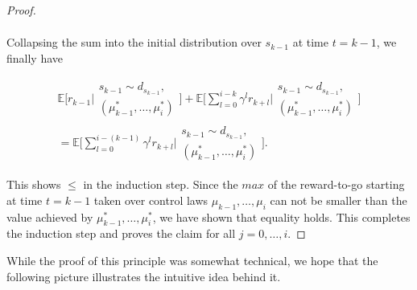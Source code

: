 \documentclass[11pt]{article} %
\begin{document}
\begin{proof}
\begin{equation}
\begin{array}{rll}
	\end{array}
\end{equation}

Collapsing the sum into the initial distribution over $s_{k-1}$ at time $t = k-1$, we finally have

\begin{equation}
	\begin{array}{rcl}
		\mathbb{E}\Big[ r_{k-1} \Big| \begin{array}{c}
											s_{k-1} \sim d_{s_{k-1}}, \\
											(\mu_{k-1}^*,\dots,\mu_i^*)
										\end{array} \Big] + \mathbb{E}\Big[ \sum\limits_{l=0}^{i-k} \gamma^l r_{k+l} \Big| \begin{array}{c}
																																s_{k-1} \sim d_{s_{k-1}}, \\
																																(\mu_{k-1}^*,\dots,\mu_i^*)
																															\end{array} \Big] \\
		= \mathbb{E}\Big[ \sum\limits_{l=0}^{i-(k-1)} \gamma^l r_{k+l} \Big| \begin{array}{c}
																				s_{k-1} \sim d_{s_{k-1}}, \\
																				(\mu_{k-1}^*,\dots,\mu_i^*)
																			\end{array} \Big] .
	\end{array}
\end{equation}

This shows $\le$ in the induction step. Since the $max$ of the reward-to-go starting at time $t = k-1$ taken over control laws $\mu_{k-1},\dots,\mu_i$ can not be smaller than the value achieved by $\mu_{k-1}^*,\dots,\mu_i^*$, we have shown that equality holds. This completes the induction step and proves the claim for all $j = 0,\dots,i$.

\end{proof}

While the proof of this principle was somewhat technical, we hope that the following picture illustrates the intuitive idea behind it.
\end{document}

